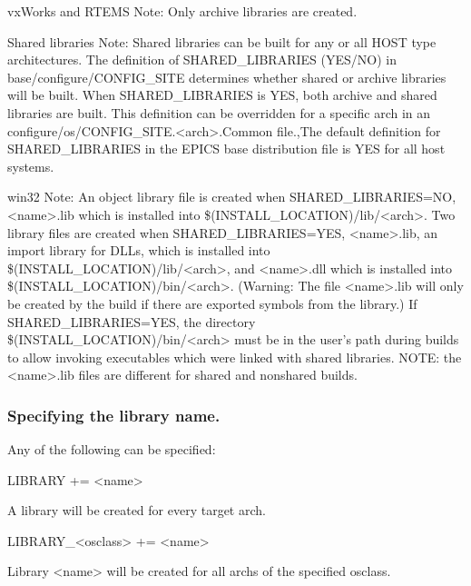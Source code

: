 vxWorks and RTEMS Note: Only archive libraries are created.

Shared libraries Note: Shared libraries can be built for any or all HOST type architectures. The definition of 
SHARED\_LIBRARIES (YES/NO) in base/configure/CONFIG\_SITE determines whether shared or archive libraries will 
be built. When SHARED\_LIBRARIES is YES, both archive and shared libraries are built. This definition can be 
overridden for a specific arch in an configure/os/CONFIG\_SITE.\textless{}arch\textgreater{}.Common file.,The default definition for 
SHARED\_LIBRARIES in the EPICS base distribution file is YES for all host systems.

win32 Note: An object library file is created when SHARED\_LIBRARIES=NO, \textless{}name\textgreater{}.lib which is installed into 
\$(INSTALL\_LOCATION)/lib/\textless{}arch\textgreater{}. Two library files are created when SHARED\_LIBRARIES=YES, \textless{}name\textgreater{}.lib, an 
import library for DLLs, which is installed into \$(INSTALL\_LOCATION)/lib/\textless{}arch\textgreater{}, and \textless{}name\textgreater{}.dll which is installed 
into \$(INSTALL\_LOCATION)/bin/\textless{}arch\textgreater{}. (Warning: The file \textless{}name\textgreater{}.lib will only be created by the build if there are 
exported symbols from the library.) If SHARED\_LIBRARIES=YES, the directory \\
\$(INSTALL\_LOCATION)/bin/\textless{}arch\textgreater{} 
must be in the user's path during builds to allow invoking executables which were linked with shared libraries. NOTE: the 
\textless{}name\textgreater{}.lib files are different for shared and nonshared builds.

\subsubsection{Specifying the library name.}

Any of the following can be specified:

\begin{description}\item {}LIBRARY += \textless{}name\textgreater{}

\end{description}A library will be created for every target arch.

\begin{description}\item LIBRARY\_\textless{}osclass\textgreater{} += \textless{}name\textgreater{}

\end{description}Library \textless{}name\textgreater{} will be created for all archs of the specified osclass.

